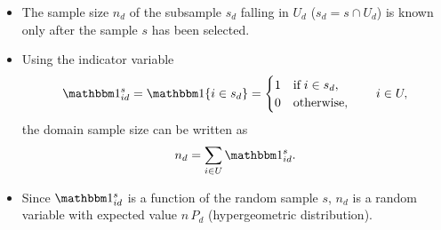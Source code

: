 \documentclass{my_eth_beamer}
\numberwithin{equation}{section}
\begin{document}
\begin{frame}
    \begin{itemize}
    \setlength{\itemsep}{8pt}
        \item The \alert{sample size} $n_d$ of the subsample $s_d$ falling in
            $U_d$ ($s_d = s \cap U_d$) is known \alert{only after} the sample
            $s$ has been selected.
        \item Using the indicator variable
            \begin{equation*}
                \indicator_{id}^s = \indicator\{i \in s_d\} = \begin{cases}
                    1 & \text{if} \; i \in s_d,\\
                    0 & \text{otherwise},
                \end{cases} \qquad i \in U,
            \end{equation*}
            \noindent the \alert{domain sample size} can be written as
            \begin{equation*}
                n_d = \sum_{i \in U}\indicator_{id}^s.
            \end{equation*}
        \item Since $\indicator_{id}^s$ is a function of the random sample
            $s$, $n_d$ is a \alert{random variable} with expected value
            $n\,P_d$ (hypergeometric distribution).
    \end{itemize}
\end{frame}
\end{document}
